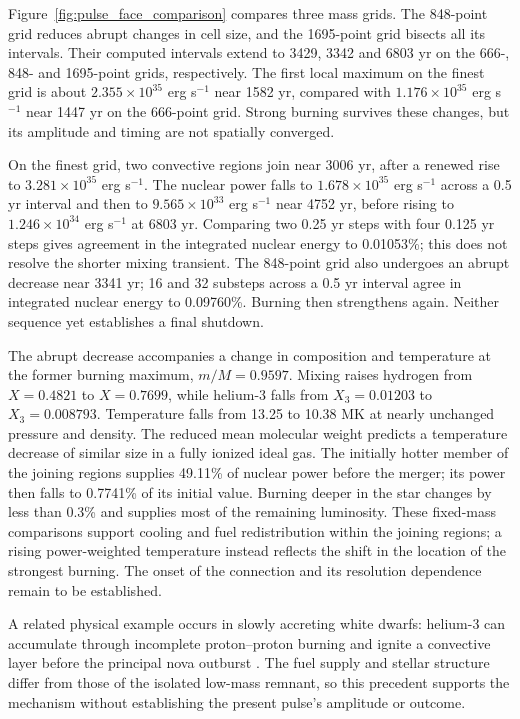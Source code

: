 \documentclass[11pt,letterpaper]{article}
\begin{document}
Figure~\ref{fig:pulse_face_comparison} compares three mass grids. The
848-point grid reduces abrupt changes in cell size, and the 1695-point grid
bisects all its intervals. Their computed intervals extend to 3429, 3342
and 6803 yr on the 666-, 848- and 1695-point grids, respectively.
The first local maximum on the finest grid is about
$2.355\times10^{35}$ erg s$^{-1}$ near 1582 yr, compared with
$1.176\times10^{35}$ erg s$^{-1}$ near 1447 yr on the 666-point grid.
Strong burning survives these changes, but its amplitude and timing
are not spatially converged.

On the finest grid, two convective regions join near 3006 yr, after a
renewed rise to $3.281\times10^{35}$ erg s$^{-1}$. The nuclear power falls
to $1.678\times10^{35}$ erg s$^{-1}$ across a 0.5 yr interval and then to
$9.565\times10^{33}$ erg s$^{-1}$ near 4752 yr, before rising to
$1.246\times10^{34}$ erg s$^{-1}$ at 6803 yr. Comparing two
0.25 yr steps with four 0.125 yr steps gives agreement in the integrated
nuclear energy to 0.01053\%; this does not resolve the shorter mixing
transient. The 848-point grid also undergoes an abrupt decrease near
3341 yr; 16 and 32 substeps across a 0.5 yr interval agree in integrated
nuclear energy to 0.09760\%. Burning then strengthens again. Neither
sequence yet establishes a final shutdown.

The abrupt decrease accompanies a change in composition and temperature
at the former burning maximum, $m/M=0.9597$. Mixing raises hydrogen from
$X=0.4821$ to $X=0.7699$, while helium-3 falls from $X_3=0.01203$ to
$X_3=0.008793$. Temperature falls from 13.25 to 10.38 MK at nearly
unchanged pressure and density. The reduced mean molecular weight predicts
a temperature decrease of similar size in a fully ionized ideal gas.
The initially hotter member of the joining regions supplies 49.11\% of
nuclear power before the merger; its power then falls to 0.7741\% of its
initial value. Burning deeper in the star changes by less than 0.3\%
and supplies most of the remaining luminosity. These fixed-mass comparisons
support cooling and fuel redistribution within the joining regions;
a rising power-weighted temperature instead reflects the shift in the
location of the strongest burning. The onset of the connection and its
resolution dependence remain to be established.

A related physical example occurs in slowly accreting white dwarfs: helium-3
can accumulate through incomplete proton--proton burning and ignite a convective
layer before the principal nova outburst \cite{denissenkov13}. The fuel supply
and stellar structure differ from those of the isolated low-mass remnant, so
this precedent supports the mechanism without establishing the present pulse's
amplitude or outcome.
\end{document}

